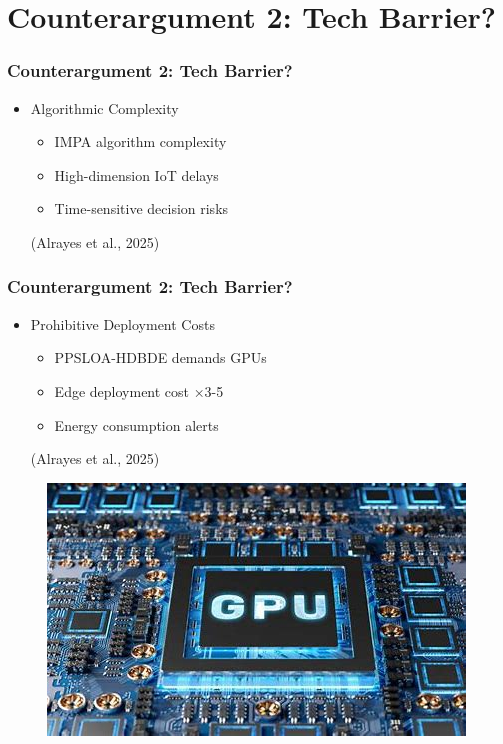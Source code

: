 \documentclass{beamer}
\begin{document}
\section{Counterargument 2: Tech Barrier?}
\begin{frame}
 \frametitle{Counterargument 2: Tech Barrier?}
\begin{minipage}{\textwidth}
{\linespread{2}
\begin{itemize}
    \item {\Large Algorithmic Complexity}\\
    \begin{itemize}
        \item <1-> {\large IMPA algorithm complexity}
        \item <2-> {\large High-dimension IoT delays}
        \item <3-> {\large Time-sensitive decision risks}
    \end{itemize}
    (Alrayes et al., 2025)
\end{itemize}
}

\end{minipage}
\end{frame}


\begin{frame}
 \frametitle{Counterargument 2: Tech Barrier?}
\begin{minipage}{\textwidth}
{\linespread{1.8}
\begin{itemize}
    \item {\Large Prohibitive Deployment Costs}
    \begin{itemize}
        \item <1-> {\large PPSLOA-HDBDE demands GPUs}
        \item <2-> {\large Edge deployment cost ×3-5}
        \item <3-> {\large Energy consumption alerts} 
    \end{itemize}
    (Alrayes et al., 2025)
\end{itemize}
}
\begin{figure}
    \centering
    \includegraphics[width=0.35\linewidth]{figure 6.png}
    \label{fig:enter-label}
\end{figure}

\end{minipage}
\end{frame}
\end{document}
